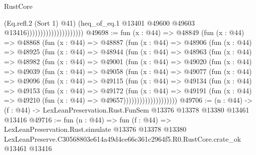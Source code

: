 \begin{lexlean}{RustCore}
\begin{coremodule}
                                            (Eq.refl.{2} (Sort 1) @41)
                                            (heq_of_eq.{1}
                                              @13401
                                              @49600
                                              @49603
                                              @13416)))))))))))))))))))))
@49698 := fun (x : @44) =>
  @48849
    (fun (x : @44) =>
    @48868
      (fun (x : @44) =>
      @48887
        (fun (x : @44) =>
        @48906
          (fun (x : @44) =>
          @48925
            (fun (x : @44) =>
            @48944
              (fun (x : @44) =>
              @48963
                (fun (x : @44) =>
                @48982
                  (fun (x : @44) =>
                  @49001
                    (fun (x : @44) =>
                    @49020
                      (fun (x : @44) =>
                      @49039
                        (fun (x : @44) =>
                        @49058
                          (fun (x : @44) =>
                          @49077
                            (fun (x : @44) =>
                            @49096
                              (fun (x : @44) =>
                              @49115
                                (fun (x : @44) =>
                                @49134
                                  (fun (x : @44) =>
                                  @49153
                                    (fun (x : @44) =>
                                    @49172
                                      (fun (x : @44) =>
                                      @49191
                                        (fun (x : @44) =>
                                        @49210 (fun (x : @44) => @49657))))))))))))))))))))
@49706 := (n : @44) ->
  (f : @44) -> LexLeanPreservation.Rust.FunSem @13376 @13378 @13380 @13461 @13416
@49716 := fun (n : @44) =>
  fun (f : @44) =>
  LexLeanPreservation.Rust.simulate
    @13376
    @13378
    @13380
    LexLeanPreserve.C30568803e614a49d4ce66c361c2964f5.R0.RustCore.crate_ok
    @13461
    @13416
\end{coremodule}
\end{lexlean}
